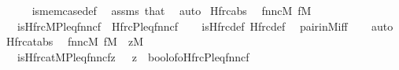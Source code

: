 \begin{isabellebody}
\ \ \ \ \isamarkupfalse%
\ is{\isacharunderscore}{\kern0pt}mem{\isacharunderscore}{\kern0pt}case{\isacharunderscore}{\kern0pt}def\ \isamarkupfalse%
\ assms\ that\ \isamarkupfalse%
\ auto\isanewline
{}\isamarkupfalse%
%
\endisatagproof
{\isafoldproof}%
%
\isadelimproof
\isanewline
%
\endisadelimproof
\isanewline
\isanewline
{}\isamarkupfalse%
\ Hfrc{\isacharunderscore}{\kern0pt}abs{\isacharcolon}{\kern0pt}\isanewline
\ \ {\isachardoublequoteopen}{\isasymlbrakk}fnnc{\isasymin}M{\isacharsemicolon}{\kern0pt}\ f{\isasymin}M{\isasymrbrakk}\ {\isasymLongrightarrow}\isanewline
\ \ \ is{\isacharunderscore}{\kern0pt}Hfrc{\isacharparenleft}{\kern0pt}{\isacharhash}{\kern0pt}{\isacharhash}{\kern0pt}M{\isacharcomma}{\kern0pt}P{\isacharcomma}{\kern0pt}leq{\isacharcomma}{\kern0pt}fnnc{\isacharcomma}{\kern0pt}f{\isacharparenright}{\kern0pt}\ {\isasymlongleftrightarrow}\ Hfrc{\isacharparenleft}{\kern0pt}P{\isacharcomma}{\kern0pt}leq{\isacharcomma}{\kern0pt}fnnc{\isacharcomma}{\kern0pt}f{\isacharparenright}{\kern0pt}{\isachardoublequoteclose}\isanewline
%
\isadelimproof
\ \ %
\endisadelimproof
%
\isatagproof
{}\isamarkupfalse%
\ is{\isacharunderscore}{\kern0pt}Hfrc{\isacharunderscore}{\kern0pt}def\ Hfrc{\isacharunderscore}{\kern0pt}def\ \isamarkupfalse%
\ pair{\isacharunderscore}{\kern0pt}in{\isacharunderscore}{\kern0pt}M{\isacharunderscore}{\kern0pt}iff\isanewline
\ \ \isamarkupfalse%
\ auto%
\endisatagproof
{\isafoldproof}%
%
\isadelimproof
\isanewline
%
\endisadelimproof
\isanewline
{}\isamarkupfalse%
\ Hfrc{\isacharunderscore}{\kern0pt}at{\isacharunderscore}{\kern0pt}abs{\isacharcolon}{\kern0pt}\isanewline
\ \ {\isachardoublequoteopen}{\isasymlbrakk}fnnc{\isasymin}M{\isacharsemicolon}{\kern0pt}\ f{\isasymin}M\ {\isacharsemicolon}{\kern0pt}\ z{\isasymin}M{\isasymrbrakk}\ {\isasymLongrightarrow}\isanewline
\ \ \ is{\isacharunderscore}{\kern0pt}Hfrc{\isacharunderscore}{\kern0pt}at{\isacharparenleft}{\kern0pt}{\isacharhash}{\kern0pt}{\isacharhash}{\kern0pt}M{\isacharcomma}{\kern0pt}P{\isacharcomma}{\kern0pt}leq{\isacharcomma}{\kern0pt}fnnc{\isacharcomma}{\kern0pt}f{\isacharcomma}{\kern0pt}z{\isacharparenright}{\kern0pt}\ {\isasymlongleftrightarrow}\ \ z\ {\isacharequal}{\kern0pt}\ bool{\isacharunderscore}{\kern0pt}of{\isacharunderscore}{\kern0pt}o{\isacharparenleft}{\kern0pt}Hfrc{\isacharparenleft}{\kern0pt}P{\isacharcomma}{\kern0pt}leq{\isacharcomma}{\kern0pt}fnnc{\isacharcomma}{\kern0pt}f{\isacharparenright}{\kern0pt}{\isacharparenright}{\kern0pt}\ {\isachardoublequoteclose}\isanewline

\end{isabellebody}
